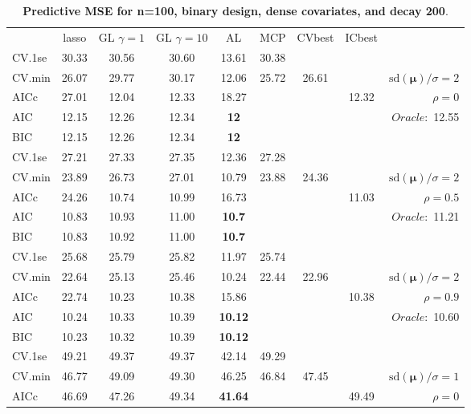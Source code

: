 \clearpage
\begin{table}\vspace{-.5cm}
\caption[l]{ { \bf Predictive MSE for n=100, binary design, 
dense covariates, and  decay  200}.}
\vspace{-.5cm}
\footnotesize{}
\begin{center}
\begin{tabular}{l*{7}{c}|r}
 & lasso & GL $\gamma=1$ & GL $\gamma=10$ & AL & MCP  & CVbest & ICbest  \\
\cline{1-9}
CV.1se & 30.33 & 30.56 & 30.60 & 13.61 & 30.38 & & & \\
CV.min & 26.07 & 29.77 & 30.17 & 12.06 & 25.72 & 26.61 & & $\mathrm{sd}(\mathbf{\mu})/\sigma=2$ \\
AICc & 27.01 & 12.04 & 12.33 & 18.27 & & & 12.32 &  $\rho=0$ \\
AIC & 12.15 & 12.26 & 12.34 & {\bf 12} & & & &  \multirow{2}{*}{$Oracle: $ 12.55} \\
BIC & 12.15 & 12.26 & 12.34 & {\bf 12} & & & &  \\
 \hline 
CV.1se & 27.21 & 27.33 & 27.35 & 12.36 & 27.28 & & & \\
CV.min & 23.89 & 26.73 & 27.01 & 10.79 & 23.88 & 24.36 & & $\mathrm{sd}(\mathbf{\mu})/\sigma=2$ \\
AICc & 24.26 & 10.74 & 10.99 & 16.73 & & & 11.03 &  $\rho=0.5$ \\
AIC & 10.83 & 10.93 & 11.00 & {\bf 10.7} & & & &  \multirow{2}{*}{$Oracle: $ 11.21} \\
BIC & 10.83 & 10.92 & 11.00 & {\bf 10.7} & & & &  \\
 \hline 
CV.1se & 25.68 & 25.79 & 25.82 & 11.97 & 25.74 & & & \\
CV.min & 22.64 & 25.13 & 25.46 & 10.24 & 22.44 & 22.96 & & $\mathrm{sd}(\mathbf{\mu})/\sigma=2$ \\
AICc & 22.74 & 10.23 & 10.38 & 15.86 & & & 10.38 &  $\rho=0.9$ \\
AIC & 10.24 & 10.33 & 10.39 & {\bf 10.12} & & & &  \multirow{2}{*}{$Oracle: $ 10.60} \\
BIC & 10.23 & 10.32 & 10.39 & {\bf 10.12} & & & &  \\
 \hline 
CV.1se & 49.21 & 49.37 & 49.37 & 42.14 & 49.29 & & & \\
CV.min & 46.77 & 49.09 & 49.30 & 46.25 & 46.84 & 47.45 & & $\mathrm{sd}(\mathbf{\mu})/\sigma=1$ \\
AICc & 46.69 & 47.26 & 49.34 & {\bf 41.64} & & & 49.49 &  $\rho=0$ \\

\end{tabular}
\end{center}
\end{table}
